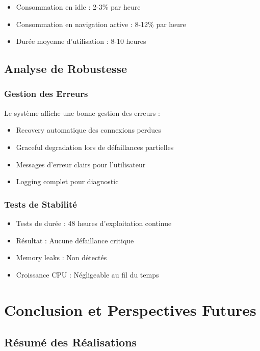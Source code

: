 \documentclass[12pt,a4paper,oneside]{report}
\begin{document}
\begin{itemize}
  \item Consommation en idle : 2-3\% par heure
  \item Consommation en navigation active : 8-12\% par heure
  \item Durée moyenne d'utilisation : 8-10 heures
\end{itemize}

\section{Analyse de Robustesse}

\subsection{Gestion des Erreurs}

Le système affiche une bonne gestion des erreurs :

\begin{itemize}
  \item Recovery automatique des connexions perdues
  \item Graceful degradation lors de défaillances partielles
  \item Messages d'erreur clairs pour l'utilisateur
  \item Logging complet pour diagnostic
\end{itemize}

\subsection{Tests de Stabilité}

\begin{itemize}
  \item Tests de durée : 48 heures d'exploitation continue
  \item Résultat : Aucune défaillance critique
  \item Memory leaks : Non détectés
  \item Croissance CPU : Négligeable au fil du temps
\end{itemize}

\newpage

\chapter{Conclusion et Perspectives Futures}

\section{Résumé des Réalisations}
\end{document}
